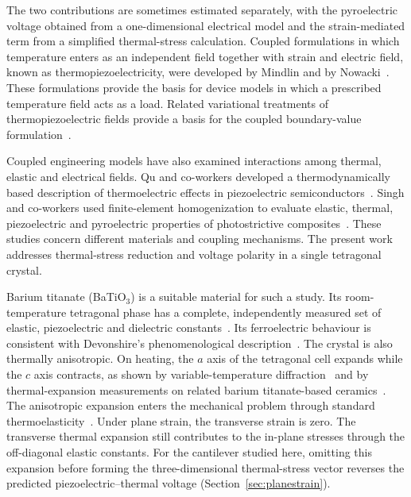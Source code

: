 \documentclass[a4paper,12pt]{elsarticle}
\begin{document}
The two contributions are sometimes estimated separately, with the
pyroelectric voltage obtained from a one-dimensional electrical model
and the strain-mediated term from a simplified thermal-stress calculation.
Coupled formulations in which temperature enters as an independent
field together with strain and electric field, known as
thermopiezoelectricity, were developed by Mindlin and by
Nowacki~\cite{Mindlin1972,Nowacki1975}. These formulations provide the
basis for device models in which a prescribed temperature field acts
as a load. Related variational treatments of thermopiezoelectric fields
provide a basis for the coupled boundary-value formulation~\cite{IJESAltay1996}.

Coupled engineering models have also examined interactions among thermal,
elastic and electrical fields. Qu and co-workers developed a
thermodynamically based description of thermoelectric effects in
piezoelectric semiconductors~\cite{IJESQu2023}. Singh and co-workers used
finite-element homogenization to evaluate elastic, thermal, piezoelectric
and pyroelectric properties of photostrictive composites~\cite{IJESSingh2022}.
These studies concern different materials and coupling mechanisms. The
present work addresses thermal-stress reduction and voltage polarity in
a single tetragonal crystal.

Barium titanate (BaTiO$_3$) is a suitable material for such a study. Its
room-temperature tetragonal phase has a complete, independently measured
set of elastic, piezoelectric and dielectric constants~\cite{Zgonik1994,Berlincourt1958}.
Its ferroelectric behaviour is consistent with Devonshire's
phenomenological description~\cite{Devonshire1949}. The crystal is also
thermally anisotropic. On heating, the $a$ axis of the tetragonal cell
expands while the $c$ axis contracts, as shown by variable-temperature
diffraction~\cite{Nakatani2016} and by thermal-expansion measurements on
related barium titanate-based ceramics~\cite{Han2015,He2015Thermal}.
The anisotropic expansion enters the mechanical problem through standard
thermoelasticity~\cite{BoleyWeiner1997,Nowacki1975}. Under plane strain,
the transverse strain is zero. The transverse thermal expansion still
contributes to the in-plane stresses through the off-diagonal elastic
constants. For the cantilever studied here, omitting this expansion
before forming the three-dimensional thermal-stress vector reverses
the predicted piezoelectric--thermal voltage
(Section~\ref{sec:planestrain}).
\end{document}
